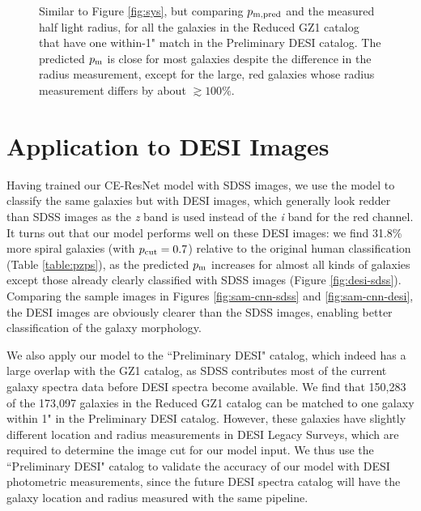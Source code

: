 \documentclass[twocolumn]{aastex631}
\begin{document}
\begin{figure}
    \caption{Similar to Figure \ref{fig:sys}, but comparing $p_{\rm m,pred}$ and the measured half light radius, for all the galaxies in the Reduced GZ1 catalog that have one within-1" match in the Preliminary DESI catalog.
    The predicted $p_{\rm m}$ is close for most galaxies despite the difference in the radius measurement, except for the large, red galaxies whose radius measurement differs by about $\gtrsim 100\%$.}
    \label{fig:desi-spec}
\end{figure}


\section{Application to DESI Images}

\label{sec:desi-image}
\label{sec:pre-desi}

Having trained our CE-ResNet model with SDSS images, we use the model to classify the same galaxies but with DESI images, which generally look redder than SDSS images as the \textit{z} band is used instead of the \textit{i} band for the red channel.
It turns out that our model performs well on these DESI images: we find 31.8\% more spiral galaxies (with $p_{\rm cut}=0.7$) relative to the original human classification (Table \ref{table:pzps}), as the predicted $p_{\rm m}$ increases for almost all kinds of galaxies except those already clearly classified with SDSS images (Figure \ref{fig:desi-sdss}).
Comparing the sample images in Figures \ref{fig:sam-cnn-sdss} and \ref{fig:sam-cnn-desi}, the DESI images are obviously clearer than the SDSS images, enabling better classification of the galaxy morphology.

We also apply our model to the ``Preliminary DESI" catalog, which indeed has a large overlap with the GZ1 catalog, as SDSS contributes most of the current galaxy spectra data before DESI spectra become available.
We find that 150,283 of the 173,097 galaxies in the Reduced GZ1 catalog can be matched to one galaxy within 1" in the Preliminary DESI catalog.
However, these galaxies have slightly different location and radius measurements in DESI Legacy Surveys, which are required to determine the image cut for our model input.
We thus use the ``Preliminary DESI" catalog to validate the accuracy of our model with DESI photometric measurements, since the future DESI spectra catalog will have the galaxy location and radius measured with the same pipeline.
\end{document}
